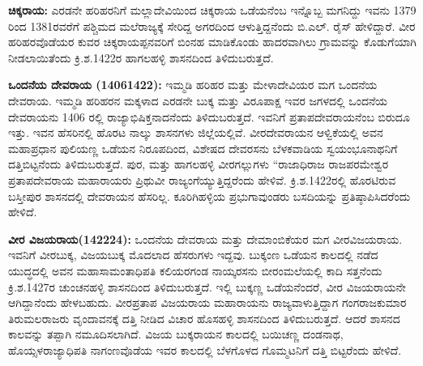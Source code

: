 \textbf{ ಚಿಕ್ಕರಾಯ:} ಎರಡನೇ ಹರಿಹರನಿಗೆ ಮಲ್ಲಾದೇವಿಯಿಂದ ಚಿಕ್ಕರಾಯ ಒಡೆಯನೆಂಬ ಇನ್ನೊಬ್ಬ ಮಗನಿದ್ದು ಇವನು 1379 ರಿಂದ 1381ರವರೆಗೆ ಪಶ್ಚಿಮದ ಮಲೆರಾಜ್ಯಕ್ಕೆ ಸೇರಿದ್ದ ಅಗರದಿಂದ ಆಳುತ್ತಿದ್ದನೆಂದು ಬಿ.ಎಲ್​. ರೈಸ್​ ಹೇಳಿದ್ದಾರೆ. ವೀರ ಹರಿಹರವೊಡೆಯರ ಕುವರ ಚಿಕ್ಕರಾಯಪ್ಪನವರಿಗೆ ಬಿಂನಹ ಮಾಡಿಕೊಂಡು ಹಾದರವಾಗಿಲು ಗ್ರಾಮವನ್ನು ಕೊಡುಗೆಯಾಗಿ ನೀಡಲಾಯಿತೆಂದು ಕ್ರಿ.ಶ.1422ರ ಹಾಗಲಹಳ್ಳಿ ಶಾಸನದಿಂದ ತಿಳಿದುಬರುತ್ತದೆ.

\textbf{ಒಂದನೆಯ ದೇವರಾಯ (1406\general{\enginline{-}}1422): } ಇಮ್ಮಡಿ ಹರಿಹರ ಮತ್ತು ಮೇಳಾದೇವಿಯರ ಮಗ ಒಂದನೆಯ ದೇವರಾಯ. ಇಮ್ಮಡಿ ಹರಿಹರನ ಮಕ್ಕಳಾದ ಎರಡನೇ ಬುಕ್ಕ ಮತ್ತು ವಿರೂಪಾಕ್ಷ ಇವರ ಜಗಳದಲ್ಲಿ ಒಂದನೆಯ ದೇವರಾಯನು 1406 ರಲ್ಲಿ ರಾಜ್ಯಾಭಿಷಿಕ್ತನಾದನೆಂದು ತಿಳಿದುಬರುತ್ತದೆ. ಇವನಿಗೆ ಪ್ರತಾಪದೇವರಾಯನೆಂಬ ಬಿರುದೂ ಇತ್ತು. ಇವನ ಹೆಸರಿನಲ್ಲಿ ಹೊರಟ ನಾಲ್ಕು ಶಾಸನಗಳು ಜಿಲ್ಲೆಯಲ್ಲಿವೆ. ವೀರದೇವರಾಯನ ಆಳ್ವಿಕೆಯಲ್ಲಿ ಅವನ ಮಹಾಪ್ರಧಾನ ಪುಲಿಯಣ್ಣ ಒಡೆಯನ ನಿರೂಪದಿಂದ, ವಿಶೇಷದ ದೇವರಸನು ಬೆಳಕವಾಡಿಯ ಸ್ವಯಂಭೂನಾಥನಿಗೆ ದತ್ತಿಬಿಟ್ಟನೆಂದು ತಿಳಿದುಬರುತ್ತದೆ. ಪುರ, ಮತ್ತು ಹಾಗಲಹಳ್ಳಿ ವೀರಗಲ್ಲುಗಳು “ರಾಜಾಧಿರಾಜ ರಾಜಪರಮೇಶ್ವರ ಪ್ರತಾಪದೇವರಾಯ ಮಹಾರಾಯರು ಪ್ರಿಥುವೀ ರಾಜ್ಯಂಗೆಯ್ಯುತ್ತಿದ್ದರೆಂದು ಹೇಳಿವೆ. ಕ್ರಿ.ಶ.1422ರಲ್ಲಿ ಹೊರಟಿರುವ ಬಸ್ತೀಪುರ ಶಾಸನದಲ್ಲಿ ದೇವರಾಯನ ಹೆಸರಿಲ್ಲ. ಕೂರಿಗಿಹಳ್ಳಿಯ ಪ್ರಭುಗಾವುಂಡರು ಬಸದಿಯನ್ನು ಪ್ರತಿಷ್ಠಾಪಿಸಿದರೆಂದು ಹೇಳಿದೆ.

\textbf{ವೀರ ವಿಜಯರಾಯ(1422\general{\enginline{-}}24):} ಒಂದನೆಯ ದೇವರಾಯ ಮತ್ತು ದೇಮಾಂಬಿಕೆಯರ ಮಗ ವೀರವಿಜಯರಾಯ. ಇವನಿಗೆ ವೀರಬುಕ್ಕ, ವಿಜಯಬುಕ್ಕ ಮೊದಲಾದ ಹೆಸರುಗಳು ಇದ್ದವು. ಬುಕ್ಕಂಣ ಒಡೆಯನ ಕಾಲದಲ್ಲಿ ನಡೆದ ಯುದ್ಧದಲ್ಲಿ ಅವನ ಮಹಾಸಾಮಂತಾಧಿಪತಿ ಕಲಿಯರಗಂಡ ನಾಯ್ಕರಸನು ಬೀರಂಮಲೆಯಲ್ಲಿ ಕಾದಿ ಸತ್ತನೆಂದು ಕ್ರಿ.ಶ.1427ರ ಚುಂಚನಹಳ್ಳಿ ಶಾಸನದಿಂದ ತಿಳಿದುಬರುತ್ತದೆ. ಇಲ್ಲಿ ಬುಕ್ಕಣ್ಣ ಒಡೆಯನೆಂದರೆ, ವೀರ ವಿಜಯರಾಯನೇ ಆಗಿದ್ದಾನೆಂದು ಹೇಳಬಹುದು. ವೀರಪ್ರತಾಪ ವಿಜಯರಾಯ ಮಹಾರಾಯನು ರಾಜ್ಯವಾಳುತ್ತಿದ್ದಾಗ ಗಂಗರಾಜಕುಮಾರ ತಿರುಮಲರಾಜರು ವೃಂದಾವನಕ್ಕೆ ದತ್ತಿ ನೀಡಿದ ವಿಚಾರ ಹೊಸಹಳ್ಳಿ ಶಾಸನದಿಂದ ತಿಳಿದುಬರುತ್ತದೆ. ಆದರೆ ಶಾಸನದ ಕಾಲವನ್ನು ತಪ್ಪಾಗಿ ನಮೂದಿಸಲಾಗಿದೆ. ವಿಜಯ ಬುಕ್ಕರಾಯನ ಕಾಲದಲ್ಲಿ ಬಯಿಚಣ್ಣ ದಂಡನಾಥ, ಹೊಯ್ಸಳರಾಜ್ಯಾಧಿಪತಿ ನಾಗಂಣವೊಡೆಯ ಇವರ ಕಾಲದಲ್ಲಿ ಬೆಳಗೊಳದ ಗೊಮ್ಮಟನಿಗೆ ದತ್ತಿ ಬಿಟ್ಟರೆಂದು ಹೇಳಿದೆ.

